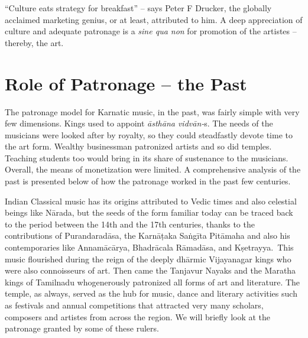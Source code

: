 \vspace{-.07cm}

“Culture eats strategy for breakfast” – says Peter F Drucker, the globally acclaimed marketing genius, or at least, attributed to him. A deep appreciation of culture and adequate patronage is a \textit{sine qua non} for promotion of the artistes – thereby, the art.

\vspace{-.5cm}

\section*{Role of Patronage – the Past}

\vspace{-.2cm}

The patronage model for Karnatic music, in the past, was fairly simple with very few dimensions. Kings used to appoint \textit{āsthāna vidvān-}s. The needs of the musicians were looked after by royalty, so they could steadfastly devote time to the art form. Wealthy businessman patronized artists and so did temples. Teaching students too would bring in its share of sustenance to the musicians. Overall, the means of monetization were limited. A comprehensive analysis of the past is presented below of how the patronage worked in the past few centuries.


Indian Classical music has its origins attributed to Vedic times and also celestial beings like Nārada, but the seeds of the form familiar today can be traced back to the period between the 14th and the 17th centuries, thanks to the contributions of Purandaradāsa, the Karnāṭaka Saṅgīta Pitāmaha and also his contemporaries like Annamācārya, Bhadrācala Rāmadāsa, and Kṣetrayya.~This music flourished during the reign of the deeply dhārmic Vijayanagar kings who were also connoisseurs of art. Then came the Tanjavur Nayaks and the Maratha kings of Tamilnadu whogenerously patronized all forms of art and literature. The temple, as always, served as the hub for music, dance and literary activities such as festivals and annual competitions that attracted very many scholars, composers and artistes from across the region. We will briefly look at the patronage granted by some of these rulers.

